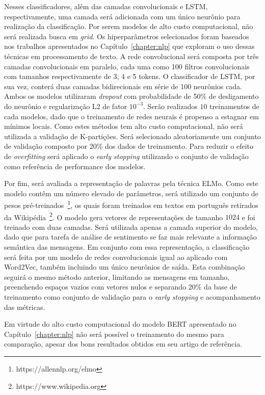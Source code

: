 Nesses classificadores, além das camadas convolucionais e LSTM, respectivamente,
uma camada será adicionada com um único neurônio para realização da
classificação.
Por serem modelos de alto custo computacional, não será realizada busca em
\textit{grid}.
Os hiperparâmetros selecionados foram baseados nos trabalhos apresentados no
Capítulo~\ref{chapter:nlp} que exploram o uso dessas técnicas em processamento
de texto.
A rede convolucional será composta por três camadas convolucionais em paralelo,
cada uma como 100 filtros convolucionais com tamanhos respectivamente de 3, 4 e
5 tokens.
O classificador de LSTM, por sua vez, conterá duas camadas bidirecionais em
série de 100 neurônios cada.
Ambos os modelos utilizaram \textit{dropout} com probabilidade de 50\% de
desligamento do neurônio e regularização L2 de fator $10^{-3}$.
Serão realizados $10$ treinamentos de cada modelos, dado que o treinamento de
redes neurais é propenso a estagnar em mínimos locais.
Como estes métodos tem alto custo computacional, não será utilizada a validação
de K-partições.
Será selecionado aleatoriamente um conjunto de validação composto por 20\% dos
dados de treinamento.
Para reduzir o efeito de \textit{overfitting} será aplicado o \textit{early
stopping} utilizando o conjunto de validação como referência de performance
dos modelos.

Por fim, será avaliada a representação de palavras pela técnica ELMo.
Como este modelo contêm um número elevado de parâmetros, será utilizado um
conjunto de pesos pré-treinados~\footnote{https://allennlp.org/elmo}, os quais
foram treinados em textos em português retirados da
Wikipédia~\footnote{https://www.wikipedia.org}.
O modelo gera vetores de representações de tamanho $1024$ e foi treinado com
duas camadas.
Será utilizada apenas a camada superior do modelo, dado que para tarefa de
análise de sentimento se faz mais relevante a informação semântica das mensagens.
Em conjunto com essa representação, a classificação será feita por um modelo de
redes convolucionais igual ao aplicado com Word2Vec, também incluindo um único
neurônios de saída.
Esta combinação seguirá o mesmo método anterior, limitando as mensagens em tamanho,
preenchendo espaços vazios com vetores nulos e separando 20\% da base de treinamento como
conjunto de validação para o \textit{early stopping} e acompanhamento das métricas.

Em virtude do alto custo computacional do modelo BERT apresentado no
Capítulo~\ref{chapter:nlp} não será possível o treinamento do mesmo para
comparação, apesar dos bons resultados obtidos em seu artigo de referência.

